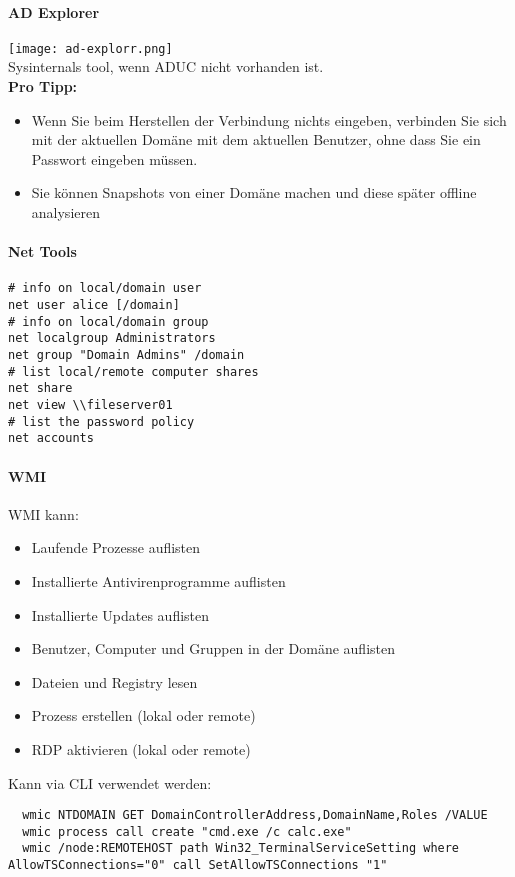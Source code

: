 \paragraph{AD Explorer}
\texttt{[image: ad-explorr.png]}\\
Sysinternals tool, wenn ADUC nicht vorhanden ist.\\
\textbf{Pro Tipp:}\\
\begin{itemize}
  \item Wenn Sie beim Herstellen der Verbindung nichts eingeben, verbinden Sie sich mit der aktuellen Domäne mit dem aktuellen Benutzer, ohne dass Sie ein Passwort eingeben müssen.
  \item Sie können Snapshots von einer Domäne machen und diese später offline analysieren
\end{itemize}

\paragraph{Net Tools}\label{par:nettools}
\begin{lstlisting}
# info on local/domain user
net user alice [/domain]
# info on local/domain group
net localgroup Administrators
net group "Domain Admins" /domain
# list local/remote computer shares
net share
net view \\fileserver01
# list the password policy
net accounts
\end{lstlisting}

\paragraph{WMI}\label{par:wmi}
WMI kann:
\begin{itemize}
  \item Laufende Prozesse auflisten
  \item Installierte Antivirenprogramme auflisten
  \item Installierte Updates auflisten
  \item Benutzer, Computer und Gruppen in der Domäne auflisten
  \item Dateien und Registry lesen
  \item Prozess erstellen (lokal oder remote)
  \item RDP aktivieren (lokal oder remote)
\end{itemize}

Kann via CLI verwendet werden:
\begin{lstlisting}
  wmic NTDOMAIN GET DomainControllerAddress,DomainName,Roles /VALUE
  wmic process call create "cmd.exe /c calc.exe"
  wmic /node:REMOTEHOST path Win32_TerminalServiceSetting where AllowTSConnections="0" call SetAllowTSConnections "1"
\end{lstlisting}

